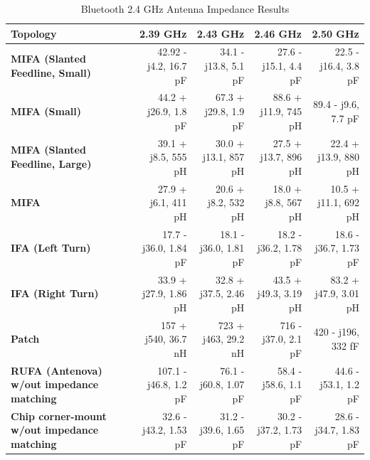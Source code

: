 \documentclass[journal,compsoc]{IEEEtran}
\begin{document}
\begin{table}[H]
  \centering
  \begin{tabular}{>{\bfseries}l|l l l l}
  \hline
    Topology & \multicolumn{1}{|c|}{2.39 GHz} & \multicolumn{1}{|c|}{2.43 GHz} & \multicolumn{1}{|c|}{2.46 GHz} & \multicolumn{1}{|c|}{2.50 GHz} \\
    \hline
    MIFA (Slanted Feedline, Small) & \multicolumn{1}{|r|}{42.92 - j4.2, 16.7 pF} & \multicolumn{1}{|r|}{34.1 - j13.8, 5.1 pF} & \multicolumn{1}{|r|}{27.6 - j15.1, 4.4 pF} & \multicolumn{1}{|r|}{22.5 - j16.4, 3.8 pF} \\
    MIFA (Small) & \multicolumn{1}{|r|}{44.2 + j26.9, 1.8 pF} & \multicolumn{1}{|r|}{67.3 + j29.8, 1.9 pF} & \multicolumn{1}{|r|}{88.6 + j11.9, 745 pH} & \multicolumn{1}{|r|}{89.4 - j9.6, 7.7 pF} \\
    MIFA (Slanted Feedline, Large) & \multicolumn{1}{|r|}{39.1 + j8.5, 555 pH} & \multicolumn{1}{|r|}{30.0 + j13.1, 857 pH} & \multicolumn{1}{|r|}{27.5 + j13.7, 896 pH} & \multicolumn{1}{|r|}{22.4 + j13.9, 880 pH} \\
    MIFA & \multicolumn{1}{|r|}{27.9 + j6.1, 411 pH} & \multicolumn{1}{|r|}{20.6 + j8.2, 532 pH} & \multicolumn{1}{|r|}{18.0 + j8.8, 567 pH} & \multicolumn{1}{|r|}{10.5 + j11.1, 692 pH} \\
    IFA (Left Turn) & \multicolumn{1}{|r|}{17.7 - j36.0, 1.84 pF} & \multicolumn{1}{|r|}{18.1 - j36.0, 1.81 pF} & \multicolumn{1}{|r|}{18.2 - j36.2, 1.78 pF} & \multicolumn{1}{|r|}{18.6 - j36.7, 1.73 pF} \\
    IFA (Right Turn) & \multicolumn{1}{|r|}{33.9 + j27.9, 1.86 pH} & \multicolumn{1}{|r|}{32.8 + j37.5, 2.46 pH} & \multicolumn{1}{|r|}{43.5 + j49.3, 3.19 pH} & \multicolumn{1}{|r|}{83.2 + j47.9, 3.01 pH} \\
    Patch & \multicolumn{1}{|r|}{157 + j540, 36.7 nH} & \multicolumn{1}{|r|}{723 + j463, 29.2 nH} & \multicolumn{1}{|r|}{716 - j37.0, 2.1 pF} & \multicolumn{1}{|r|}{420 - j196, 332 fF} \\
    RUFA (Antenova) w/out impedance matching & \multicolumn{1}{|r|}{107.1 - j46.8, 1.2 pF} & \multicolumn{1}{|r|}{76.1 - j60.8, 1.07 pF} & \multicolumn{1}{|r|}{58.4 - j58.6, 1.1 pF} & \multicolumn{1}{|r|}{44.6 - j53.1, 1.2 pF} \\
    Chip corner-mount  w/out impedance matching & \multicolumn{1}{|r|}{32.6 - j43.2, 1.53 pF} & \multicolumn{1}{|r|}{31.2 - j39.6, 1.65 pF} & \multicolumn{1}{|r|}{30.2 - j37.2, 1.73 pF} & \multicolumn{1}{|r|}{28.6 - j34.7, 1.83 pF} \\ \hline
  \end{tabular} \newline
  \caption{Bluetooth 2.4 GHz Antenna Impedance Results}
\end{table}
\end{document}
